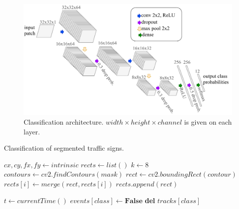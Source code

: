 \begin{figure}[h]
  \centering
  \includegraphics[width=.9\textwidth]{figures/classification-architecture.pdf}
  \caption{Classification architecture. $width \times height\times channel$ is
  given on each layer.}
  \label{figure:classification-architecture}
\end{figure}

\begin{algorithm}[h]
  \caption{Classification of segmented traffic signs.}
  \label{algorithm:classification}
  \begin{algorithmic}[1]
    \State $cx, cy, fx, fy \gets intrinsic$
    \State $rects \gets list()$
    \State $k \gets 8$
    \State $contours \gets cv2.findContours(mask)$
      \State $rect \gets cv2.boundingRect(contour)$
        \State $rects[i] \gets merge(rect, rects[i])$
      \EndIf
      \State $rects.append(rect)$
    \EndFor

    \State $t \gets currentTime()$
      \State $events[class] \gets \textbf{False}$
        \State \textbf{del} $tracks[class]$
      \EndIf
    \EndFor
  \end{algorithmic}
\end{algorithm}

